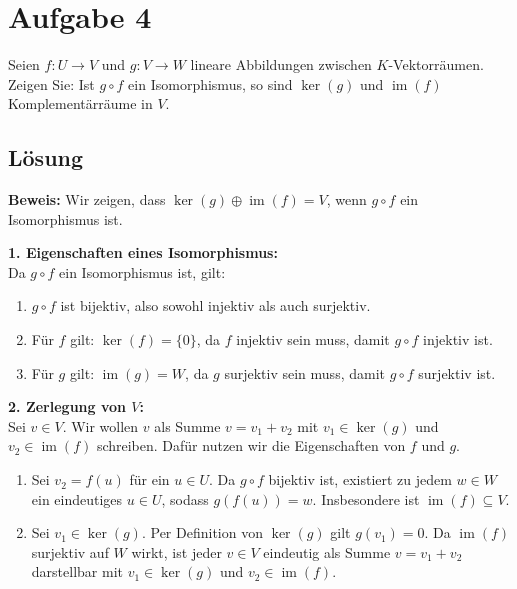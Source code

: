 \documentclass[11pt]{article}
\begin{document}
\section*{Aufgabe 4}

Seien \( f: U \to V \) und \( g: V \to W \) lineare Abbildungen zwischen \( K \)-Vektorräumen. Zeigen Sie: Ist \( g \circ f \) ein Isomorphismus, so sind \( \ker(g) \) und \( \operatorname{im}(f) \) Komplementärräume in \( V \).

\subsection*{Lösung}

\textbf{Beweis:} Wir zeigen, dass \( \ker(g) \oplus \operatorname{im}(f) = V \), wenn \( g \circ f \) ein Isomorphismus ist.

\textbf{1. Eigenschaften eines Isomorphismus:} \\
Da \( g \circ f \) ein Isomorphismus ist, gilt:
\begin{enumerate}
    \item \( g \circ f \) ist bijektiv, also sowohl injektiv als auch surjektiv.
    \item Für \( f \) gilt: \( \ker(f) = \{0\} \), da \( f \) injektiv sein muss, damit \( g \circ f \) injektiv ist.
    \item Für \( g \) gilt: \( \operatorname{im}(g) = W \), da \( g \) surjektiv sein muss, damit \( g \circ f \) surjektiv ist.
\end{enumerate}

\textbf{2. Zerlegung von \( V \):} \\
Sei \( v \in V \). Wir wollen \( v \) als Summe \( v = v_1 + v_2 \) mit \( v_1 \in \ker(g) \) und \( v_2 \in \operatorname{im}(f) \) schreiben. Dafür nutzen wir die Eigenschaften von \( f \) und \( g \).

\begin{enumerate}
    \item Sei \( v_2 = f(u) \) für ein \( u \in U \). Da \( g \circ f \) bijektiv ist, existiert zu jedem \( w \in W \) ein eindeutiges \( u \in U \), sodass \( g(f(u)) = w \). Insbesondere ist \( \operatorname{im}(f) \subseteq V \).
    \item Sei \( v_1 \in \ker(g) \). Per Definition von \( \ker(g) \) gilt \( g(v_1) = 0 \). Da \( \operatorname{im}(f) \) surjektiv auf \( W \) wirkt, ist jeder \( v \in V \) eindeutig als Summe \( v = v_1 + v_2 \) darstellbar mit \( v_1 \in \ker(g) \) und \( v_2 \in \operatorname{im}(f) \).
\end{enumerate}
\end{document}
